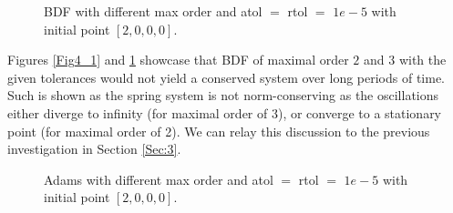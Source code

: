 \documentclass{article}
\begin{document}
\begin{figure}[H]
\centering
{}\hfill
{}\hfill
\caption{BDF with different max order and atol $=$ rtol $=$ $1e-5$ with initial point \(\left[2,0,0,0\right]\).} \label{Fig4_2}
\end{figure}
Figures \ref{Fig4_1} and \ref{Fig4_2} showcase that BDF of maximal order $2$ and $3$ with the given tolerances would not yield a conserved system over long periods of time. Such is shown as the spring system is not norm-conserving as the oscillations either diverge to infinity (for maximal order of 3), or converge to a stationary point (for maximal order of 2). We can relay this discussion to the previous investigation in Section \ref{Sec:3}.

\begin{figure}[H]
\centering
{}\hfill
{}\hfill
\caption{Adams with different max order and atol $=$ rtol $=$ $1e-5$ with initial point \(\left[2,0,0,0\right]\).} \label{Fig4_3}
\end{figure}
\end{document}

